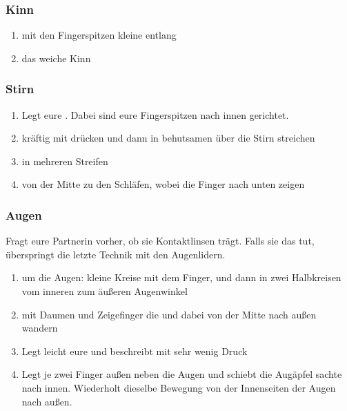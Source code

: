 \subsubsection{Kinn}
\begin{enumerate}
  \item mit den Fingerspitzen kleine  entlang
  \item das weiche Kinn 
\end{enumerate}


\subsubsection{Stirn}

\begin{enumerate}
  \item Legt eure . Dabei sind eure Fingerspitzen nach innen gerichtet.
  \item kräftig mit  drücken und dann in behutsamen  über die Stirn streichen
  \item {} in mehreren Streifen
  \item {} von der Mitte zu den Schläfen, wobei die Finger nach unten zeigen
\end{enumerate}

\subsubsection{Augen}

Fragt eure Partnerin vorher, ob sie Kontaktlinsen trägt. Falls sie das tut, überspringt die letzte Technik mit den Augenlidern.

\begin{enumerate}
  \item {} um die Augen: kleine Kreise mit dem Finger, und dann in zwei Halbkreisen vom inneren zum äußeren Augenwinkel
  \item mit Daumen und Zeigefinger die  und dabei von der Mitte nach außen wandern
  \item Legt leicht eure  und beschreibt mit sehr wenig Druck 
  \item {} Legt je zwei Finger außen neben die Augen und schiebt die Augäpfel sachte nach innen. Wiederholt dieselbe Bewegung von der Innenseiten der Augen nach außen.
\end{enumerate}


